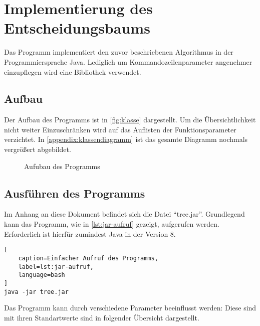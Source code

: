 \section{Implementierung des Entscheidungsbaums}\label{sec:implementierung}
Das Programm implementiert den zuvor beschriebenen Algorithmus in der Programmiersprache Java.
Lediglich um Kommandozeilenparameter angenehmer einzupflegen wird eine Bibliothek verwendet.

\subsection{Aufbau}
Der Aufbau des Programms ist in \autoref{fig:klasse} dargestellt.
Um die Übersichtlichkeit nicht weiter Einzuschränken wird auf das Auflisten der Funktionsparameter verzichtet.
In \autoref{appendix:klassendiagramm} ist das gesamte Diagramm nochmals vergrößert abgebildet.

\begin{figure}[ht!]
    \centering
    \resizebox{\textwidth}{!}{
        
    }
    \caption{Aufubau des Programms}
    \label{fig:klasse}
\end{figure}

\subsection{Ausführen des Programms}
Im Anhang an diese Dokument befindet sich die Datei \enquote{tree.jar}.
Grundlegend kann das Programm, wie in \autoref{lst:jar-aufruf} gezeigt, aufgerufen werden.
Erforderlich ist hierfür zumindest Java in der Version 8.

\begin{lstlisting}[
    caption=Einfacher Aufruf des Programms,
    label=lst:jar-aufruf,
    language=bash
]
java -jar tree.jar
\end{lstlisting}

Das Programm kann durch verschiedene Parameter beeinflusst werden:
Diese sind mit ihren Standartwerte sind in folgender Übersicht dargestellt.

